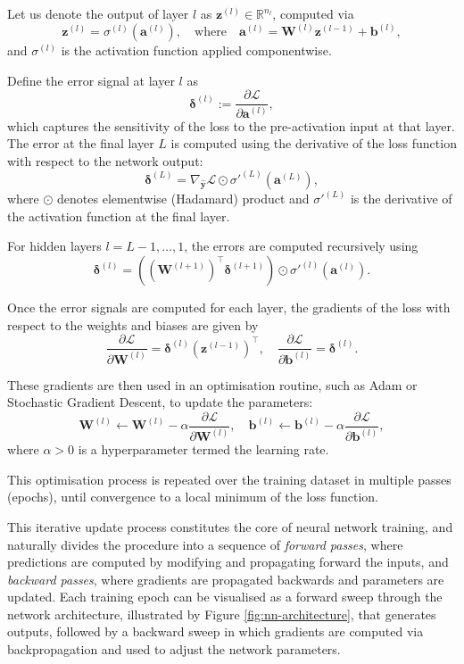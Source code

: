 Let us denote the output of layer \( l \) as \( \mathbf{z}^{(l)} \in \mathbb{R}^{n_l} \), computed via
\[
    \mathbf{z}^{(l)} = \sigma^{(l)}\left( \mathbf{a}^{(l)} \right), \quad \text{where} \quad \mathbf{a}^{(l)} = \mathbf{W}^{(l)} \mathbf{z}^{(l-1)} + \mathbf{b}^{(l)},
\]
and \( \sigma^{(l)} \) is the activation function applied componentwise.

Define the error signal at layer \( l \) as
\[
    \boldsymbol{\delta}^{(l)} := \frac{\partial \mathcal{L}}{\partial \mathbf{a}^{(l)}},
\]
which captures the sensitivity of the loss to the pre-activation input at that layer. The error at the final layer \( L \) is computed using the derivative of the loss function with respect to the network output:
\[
    \boldsymbol{\delta}^{(L)} = \nabla_{\hat{\mathbf{y}}} \mathcal{L} \odot \sigma'^{(L)}\left( \mathbf{a}^{(L)} \right),
\]
where \( \odot \) denotes elementwise (Hadamard) product and \( \sigma'^{(L)} \) is the derivative of the activation function at the final layer.

For hidden layers \( l = L-1, \dots, 1 \), the errors are computed recursively using
\[
    \boldsymbol{\delta}^{(l)} = \left( (\mathbf{W}^{(l+1)})^\top \boldsymbol{\delta}^{(l+1)} \right) \odot \sigma'^{(l)}\left( \mathbf{a}^{(l)} \right).
\]

Once the error signals are computed for each layer, the gradients of the loss with respect to the weights and biases are given by
\[
    \frac{\partial \mathcal{L}}{\partial \mathbf{W}^{(l)}} = \boldsymbol{\delta}^{(l)} (\mathbf{z}^{(l-1)})^\top, \quad
    \frac{\partial \mathcal{L}}{\partial \mathbf{b}^{(l)}} = \boldsymbol{\delta}^{(l)}.
\]

These gradients are then used in an optimisation routine, such as Adam or Stochastic Gradient Descent,
to update the parameters:
\[
    \mathbf{W}^{(l)} \leftarrow \mathbf{W}^{(l)} - \alpha \frac{\partial \mathcal{L}}{\partial \mathbf{W}^{(l)}}, \quad
    \mathbf{b}^{(l)} \leftarrow \mathbf{b}^{(l)} - \alpha \frac{\partial \mathcal{L}}{\partial \mathbf{b}^{(l)}},
\]
where \( \alpha > 0 \) is a hyperparameter termed the learning rate.

This optimisation process is repeated over the training dataset in multiple passes 
(epochs), until convergence to a local minimum of the loss function.

This iterative update process constitutes the core of neural network training, and naturally 
divides the procedure into a sequence of \emph{forward passes}, where predictions are computed 
by modifying and propagating forward the inputs, 
and \emph{backward passes}, where gradients are propagated backwards and parameters are updated. Each 
training epoch can be visualised as a forward sweep through the network architecture, illustrated
by Figure \ref{fig:nn-architecture}, that generates outputs, followed by a backward sweep in which gradients are 
computed via backpropagation and used to adjust the network parameters.

